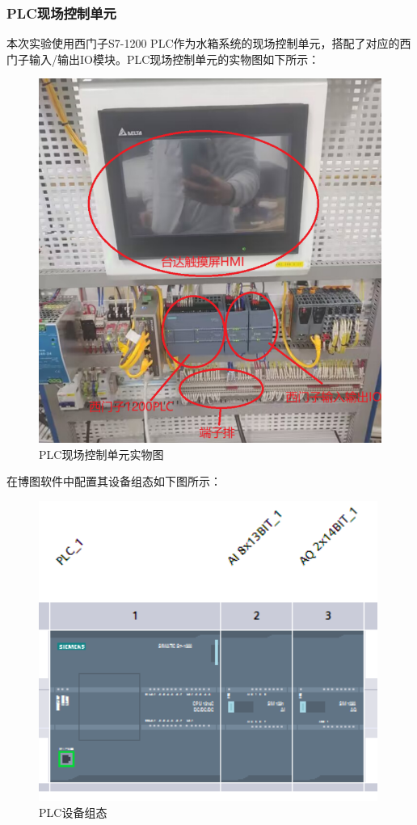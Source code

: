 \documentclass[UTF8]{article}
\begin{document}
\subsubsection{PLC现场控制单元}
本次实验使用西门子S7-1200 PLC作为水箱系统的现场控制单元，搭配了对应的西门子输入/输出IO模块。PLC现场控制单元的实物图如下所示：
\begin{figure}[H]
    \centering %
    \includegraphics[width=.6\textwidth]{figure/PLC现场控制单元实物图.png} 
    \caption{PLC现场控制单元实物图} %
\end{figure}

在博图软件中配置其设备组态如下图所示：
\begin{figure}[H]
    \centering %
    \includegraphics[width=.6\textwidth]{figure/PLC设备组态.png} 
    \caption{PLC设备组态} %
\end{figure}
\end{document}

